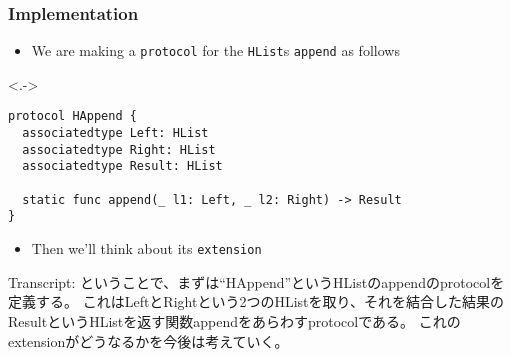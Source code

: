\begin{frame}[fragile]
  \frametitle{Implementation}

  \begin{itemize}
    \item<+-> We are making a \lstinline|protocol| for the \lstinline|HList|s \lstinline|append| as follows
  \end{itemize}

  \begin{uncoverenv}<.->
\begin{lstlisting}[style=swift]
protocol HAppend {
  associatedtype Left: HList
  associatedtype Right: HList
  associatedtype Result: HList
   
  static func append(_ l1: Left, _ l2: Right) -> Result
}
\end{lstlisting}
  \end{uncoverenv}

  \begin{itemize}
    \item<+-> Then we'll think about its \lstinline|extension|
  \end{itemize}

  \begin{notes}
    \item Transcript:
    ということで、まずは``HAppend''というHListのappendのprotocolを定義する。
    これはLeftとRightという2つのHListを取り、それを結合した結果の
    ResultというHListを返す関数appendをあらわすprotocolである。
    これのextensionがどうなるかを今後は考えていく。
  \end{notes}
\end{frame}

